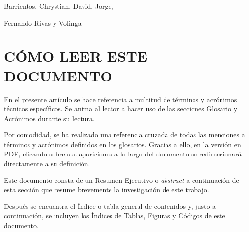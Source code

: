 \documentclass[a4paper, 12pt, spanish, twoside]{article}
\newcommand\blankpage{%
    \null
    \thispagestyle{empty}%
    \newpage}
\begin{document}
Barrientos,
Chrystian,
David,
Jorge,

Fernando Rivas y Volinga

\clearpage
\afterpage{\blankpage} %





\section*{CÓMO LEER ESTE DOCUMENTO} %

En el presente artículo se hace referencia a multitud de términos y acrónimos técnicos específicos. Se anima al lector a hacer uso de las secciones Glosario y Acrónimos durante su lectura.

Por comodidad, se ha realizado una referencia cruzada de todas las menciones a términos y acrónimos definidos en los glosarios. Gracias a ello, en la versión en PDF, clicando sobre sus apariciones a lo largo del documento se redireccionará directamente a su definición. 

Este documento consta de un Resumen Ejecutivo o \textit{abstract} a continuación de esta sección que resume brevemente la investigación de este trabajo. 

Después se encuentra el Índice o tabla general de contenidos y, justo a continuación, se incluyen los Índices de Tablas, Figuras y Códigos de este documento. 
\end{document}
